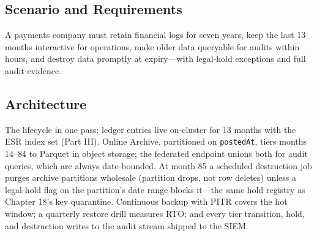 \subsection{Scenario and Requirements}
A payments company must retain financial logs for seven years, keep the last 13 months interactive for operations, make older data queryable for audits within hours, and destroy data promptly at expiry---with legal-hold exceptions and full audit evidence.

\subsection{Architecture}
The lifecycle in one pass: ledger entries live on-cluster for 13 months with the ESR index set (Part III). Online Archive, partitioned on \texttt{postedAt}, tiers months 14--84 to Parquet in object storage; the federated endpoint unions both for audit queries, which are always date-bounded. At month 85 a scheduled destruction job purges archive partitions wholesale (partition drops, not row deletes) unless a legal-hold flag on the partition's date range blocks it---the same hold registry as Chapter 18's key quarantine. Continuous backup with PITR covers the hot window; a quarterly restore drill measures RTO; and every tier transition, hold, and destruction writes to the audit stream shipped to the SIEM.

